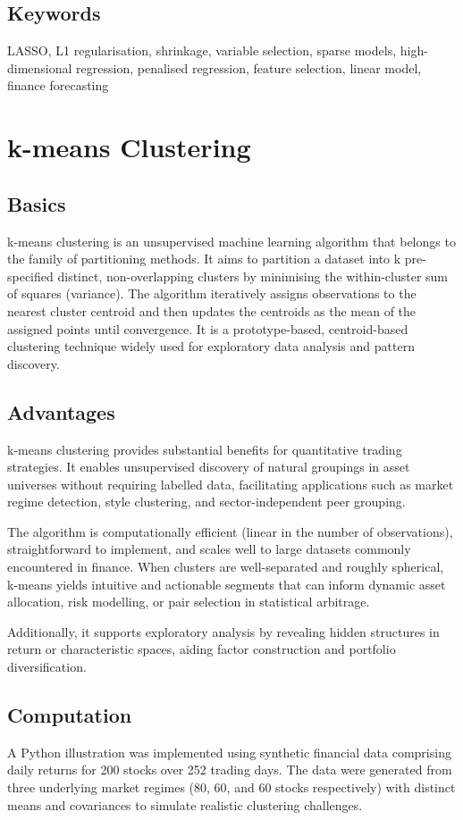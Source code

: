 \documentclass[11pt,a4paper]{article}
\begin{document}
\subsection{Keywords}
LASSO, L1 regularisation, shrinkage, variable selection, sparse models, high-dimensional regression, penalised regression, feature selection, linear model, finance forecasting
\section{k-means Clustering}
\subsection{Basics}
k-means clustering is an unsupervised machine learning algorithm that belongs to the family of partitioning methods. It aims to partition a dataset into k pre-specified distinct, non-overlapping clusters by minimising the within-cluster sum of squares (variance). The algorithm iteratively assigns observations to the nearest cluster centroid and then updates the centroids as the mean of the assigned points until convergence. It is a prototype-based, centroid-based clustering technique widely used for exploratory data analysis and pattern discovery.

\subsection{Advantages}
k-means clustering provides substantial benefits for quantitative trading strategies. It enables unsupervised discovery of natural groupings in asset universes without requiring labelled data, facilitating applications such as market regime detection, style clustering, and sector-independent peer grouping.

The algorithm is computationally efficient (linear in the number of observations), straightforward to implement, and scales well to large datasets commonly encountered in finance. When clusters are well-separated and roughly spherical, k-means yields intuitive and actionable segments that can inform dynamic asset allocation, risk modelling, or pair selection in statistical arbitrage.

Additionally, it supports exploratory analysis by revealing hidden structures in return or characteristic spaces, aiding factor construction and portfolio diversification.

\subsection{Computation}
A Python illustration was implemented using synthetic financial data comprising daily returns for 200 stocks over 252 trading days. The data were generated from three underlying market regimes (80, 60, and 60 stocks respectively) with distinct means and covariances to simulate realistic clustering challenges.
\end{document}

